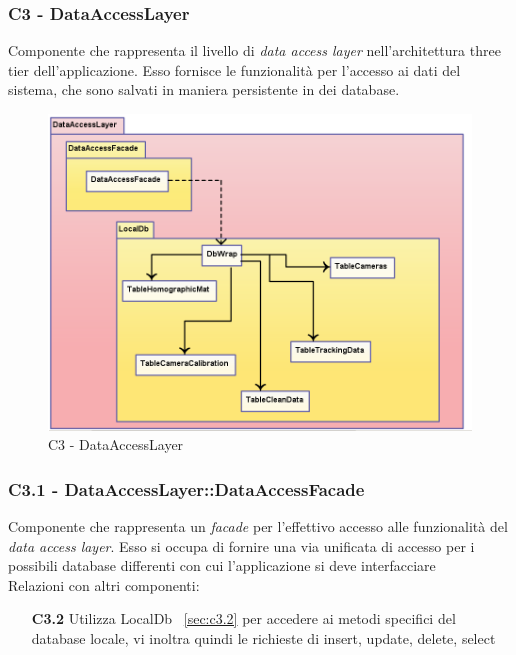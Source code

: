 \subsubsection{C3 - DataAccessLayer} \label{sec:c3}
Componente che rappresenta il livello di \textit{data access layer} nell'architettura three tier dell'applicazione. Esso fornisce le funzionalità per l'accesso ai dati del sistema, che sono salvati in maniera persistente in dei database. 
\\
\begin{figure}[!h] 

        \centering 

        \includegraphics[scale=0.4]{./images/c3.png} 

        \caption{C3 - DataAccessLayer} 

        \label{fig:c3}

        \end{figure} 

\subsubsection{C3.1 - DataAccessLayer::DataAccessFacade} \label{sec:c3.1}
Componente che rappresenta un \textit{facade} per l'effettivo accesso alle funzionalità del \textit{data access layer}. Esso si occupa di fornire una via unificata di accesso per i possibili database differenti con cui l'applicazione si deve interfacciare\\
Relazioni con altri componenti: 
\begin{itemize} 
\item [\textbf{C3.2}]
Utilizza LocalDb ~\ref{sec:c3.2} per accedere ai metodi specifici del database locale, vi inoltra quindi le richieste di insert, update, delete, select 
\end{itemize} 

